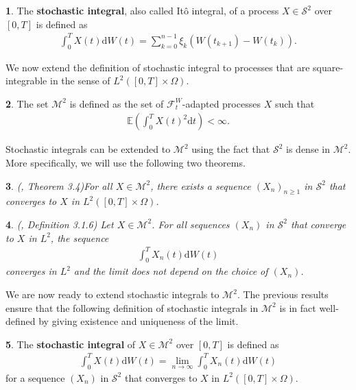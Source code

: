 \documentclass[english]{article}
\numberwithin{equation}{section}
\numberwithin{figure}{section}
\theoremstyle{bolddescit}
\newtheorem{theorem}{\protect\theoremname}[section]
\theoremstyle{definition}
\newtheorem{definition}[theorem]{\protect\definitionname}
\theoremstyle{definition}
\theoremstyle{plain}
\theoremstyle{plain}
\theoremstyle{bolddesc}
\theoremstyle{plain}
\theoremstyle{remark}
\providecommand{\definitionname}{Definition}
\providecommand{\theoremname}{Theorem}
\begin{document}
\begin{definition}
  The \textbf{stochastic integral}, also called It\^o integral, of a process $X \in \mathcal{S}^2$ over $[0,T]$ is defined as
  \begin{align*}
    \int_0^T X(t) \mathrm{d}W(t) = \sum_{k=0}^{n-1} \xi_k (W(t_{k+1}) - W(t_k)).
  \end{align*}
\end{definition}

We now extend the definition of stochastic integral to processes that are square-integrable in the sense of $L^2([0,T] \times \Omega)$.

\begin{definition}
  The set $\mathcal{M}^2$ is defined as the set of $\mathcal{F}^W_t$-adapted processes $X$ such that
  \begin{align*}
    \mathbb{E}\left(\int_0^T X(t)^2 \mathrm{d}t \right) < \infty.
  \end{align*}
\end{definition}

Stochastic integrals can be extended to $\mathcal{M}^2$ using the fact that $\mathcal{S}^2$ is dense in $\mathcal{M}^2$. More specifically, we will use the following two theorems.

\begin{theorem}
  (\cite{capinski_stochastic_2012}, Theorem 3.4)\label{thm:s2-m2-conv}
  For all $X \in \mathcal{M}^2$, there exists a sequence $(X_n)_{n \ge 1}$ in $\mathcal{S}^2$ that converges to $X$ in $L^2([0,T] \times \Omega)$.
\end{theorem}

\begin{theorem}
  (\cite{oksendal_stochastic_2003}, Definition 3.1.6)
  Let $X \in \mathcal{M}^2$. For all sequences $(X_n)$ in $\mathcal{S}^2$ that converge to $X$ in $L^2$, the sequence
  \begin{align*}
    \int_0^T X_n(t) \mathrm{d}W(t)
  \end{align*}
  converges in $L^2$ and the limit does not depend on the choice of $(X_n)$.
\end{theorem}

We are now ready to extend stochastic integrals to $\mathcal{M}^2$. The previous results ensure that the following definition of stochastic integrals in $\mathcal{M}^2$ is in fact well-defined by giving existence and uniqueness of the limit.

\begin{definition}
  The \textbf{stochastic integral} of $X \in \mathcal{M}^2$ over $[0,T]$ is defined as
  \begin{align*}
    \int_0^T X(t) \mathrm{d}W(t) = \lim_{n \to \infty} \int_0^T X_n(t) \mathrm{d}W(t)
  \end{align*}
  for a sequence $(X_n)$ in $\mathcal{S}^2$ that converges to $X$ in $L^2([0,T] \times \Omega)$.
\end{definition}
\end{document}
